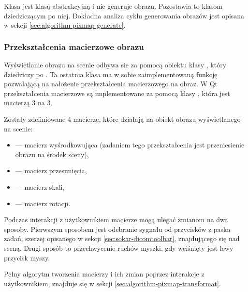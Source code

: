 Klasa  jest klasą abstrakcyjną i nie generuje obrazu.
Pozostawia to klasom dziedziczącym po niej.
Dokładna analiza cyklu generowania obrazów jest opisana w sekcji \ref{sec:algorithm-pixmap-generate}.

\subsubsection{Przekształcenia macierzowe obrazu}

\par
Wyświetlanie obrazu na scenie odbywa sie za pomocą obiektu klasy , który dziedziczy po .
Ta ostatnia klasa ma w sobie zaimplementowaną funkcję pozwalającą na nałożenie przekształcenia macierzowego na obraz.
W Qt przekształcenia macierzowe są implementowane za pomocą klasy , która jest macierzą 3 na 3.

Zostały zdefiniowane 4 macierze, które działają na obiekt obrazu wyświetlanego na scenie:
\begin{itemize}
    \item {} --- macierz wyśrodkowująca (zadaniem tego przekształcenia jest przeniesienie obrazu na środek sceny),
    \item {} --- macierz przesunięcia,
    \item {} --- macierz skali,
    \item {} --- macierz rotacji.
\end{itemize}

\par
Podczas interakcji z użytkownikiem macierze mogą ulegać zmianom na dwa sposoby.
Pierwszym sposobem jest odebranie sygnału od przycisków z paska zadań, szerzej opisanego w sekcji \ref{sec:sokar-dicomtoolbar}, znajdującego się nad sceną.
Drugi sposób to przechwycenie ruchów myszki, gdy wciśnięty jest lewy przycisk myszy.
\par
Pełny algorytm tworzenia macierzy i ich zmian poprzez interakcje z użytkownikiem, znajduje się w sekcji \ref{sec:algorithm-pixmap-transformat}.